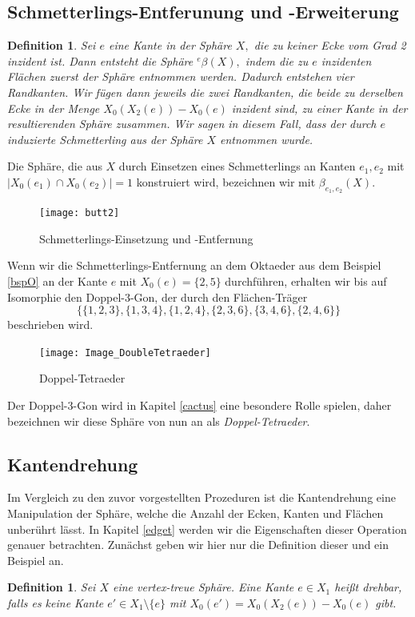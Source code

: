 \documentclass[12pt,titlepage,twoside,cleardoublepage]{article}
\theoremstyle{nummermitklammern}
\newtheorem{definition}[temp]{Definition}
\newtheorem{definition}[zahl]{Definition}
\numberwithin{equation}{section}
\begin{document}
\subsection{Schmetterlings-Entferunung und -Erweiterung}
\begin{definition}
Sei $e$ eine Kante in der Sphäre $X,$ die zu keiner Ecke vom Grad 2 inzident ist. Dann entsteht die Sphäre ${}^e\beta(X),$ indem die zu $e$ inzidenten Flächen zuerst der Sphäre entnommen werden. Dadurch entstehen vier Randkanten. Wir fügen dann jeweils die zwei Randkanten, die beide zu derselben Ecke in der Menge $X_0(X_2(e))-X_0(e)$ inzident sind, zu einer Kante in der resultierenden Sphäre zusammen. Wir sagen in diesem Fall, dass der durch $e$ induzierte Schmetterling aus der Sphäre $X$ entnommen wurde. 
\end{definition}
Die Sphäre, die aus $X$ durch Einsetzen eines Schmetterlings an Kanten $e_1,e_2$ mit $\vert X_0(e_1)\cap X_0(e_2) \vert =1$ konstruiert wird, bezeichnen wir mit $\beta_{e_1,e_2}(X).$
\begin{figure}[H]
\begin{center}
\texttt{[image: butt2]}
\end{center}
\caption{Schmetterlings-Einsetzung und -Entfernung}
\end{figure}
Wenn wir die Schmetterlings-Entfernung an dem Oktaeder aus dem Beispiel \ref{bspO} an der Kante $e$ mit $X_0(e)=\{2,5\}$ durchführen, erhalten wir bis auf Isomorphie den Doppel-3-Gon, der
durch den Flächen-Träger 
\[
\{\{1,2,3\},\{1,3,4\},\{1,2,4\},\{2,3,6\},\{3,4,6\},\{2,4,6\}\}
\]
beschrieben wird.
\begin{figure}[H]
\begin{center}
\texttt{[image: Image\_DoubleTetraeder]}
\end{center}
\caption{Doppel-Tetraeder}
\end{figure}
Der Doppel-3-Gon wird in Kapitel \ref{cactus} eine besondere Rolle spielen, daher bezeichnen wir diese Sphäre von nun an als \emph{Doppel-Tetraeder}.
\subsection{Kantendrehung}
Im Vergleich zu den zuvor vorgestellten Prozeduren ist die Kantendrehung eine Manipulation der Sphäre, welche die Anzahl der Ecken, Kanten und Flächen unberührt lässt. In Kapitel \ref{edget} werden wir die Eigenschaften dieser Operation genauer betrachten. Zunächst geben wir hier nur die Definition dieser und ein Beispiel an.
\begin{definition}
Sei $X$ eine vertex-treue Sphäre. Eine Kante $e\in X_1$ heißt  \emph{drehbar}, falls es keine Kante $e'\in X_1\setminus \{e\}$ mit $X_0(e')=X_0(X_2(e))-X_0(e)$ gibt.
\end{definition}
\end{document}
